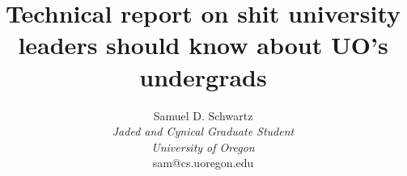 \documentclass[10]{article}
\begin{document}
\title{Technical report on shit university leaders should know about UO's undergrads\\
}


\author{Samuel D. Schwartz\\ \small \textit{Jaded and Cynical Graduate Student} \\
		\small \textit{University of Oregon}\\
		\small sam@cs.uoregon.edu
}

\maketitle
\end{document}
